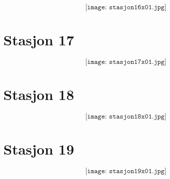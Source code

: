 $$\texttt{[image: stasjon16x01.jpg]}$$


\section{Stasjon 17}

$$\texttt{[image: stasjon17x01.jpg]}$$


\section{Stasjon 18}

$$\texttt{[image: stasjon18x01.jpg]}$$


\section{Stasjon 19}

$$\texttt{[image: stasjon19x01.jpg]}$$














































